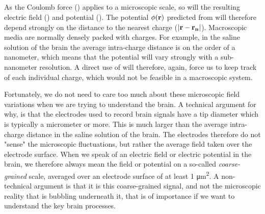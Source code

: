\subsection{}
\label{sec:Basics:Debye} 
As the Coulomb force () applies to a microscopic scale, so will the resulting electric field () and potential (). The potential ${\phi}({\bf r})$ predicted from  will therefore depend strongly on the distance to the nearest charge ($|{\bf r}-{\bf r_n}|$). Macroscopic media are normally densely packed with charges. For example, in the saline solution of the brain the average intra-charge distance is on the order of a nanometer, which means that the potential will vary strongly with a sub-nanometer resolution. A direct use of  will therefore, again, force us to keep track of each individual charge, which would not be feasible in a macroscopic system.

Fortunately, we do not need to care too much about these microscopic field variations when we are trying to understand the brain.
 A technical argument for why, is that the electrodes used to record brain signals have a tip diameter which is typically a micrometer or more. This is much larger than the average intra-charge distance in the saline solution of the brain. The electrodes therefore do not "sense" the microscopic fluctuations, but rather the average field taken over the electrode surface. 
When we speak of an electric field or electric potential in the brain, we therefore always mean the field or potential on a so-called \textit{coarse-grained} scale, averaged over an electrode surface of at least 1 \si{\square\micro\metre}. A non-technical argument is that it is this coarse-grained signal, and not the microscopic reality that is bubbling underneath it, that is of importance if we want to understand the key brain processes. 

